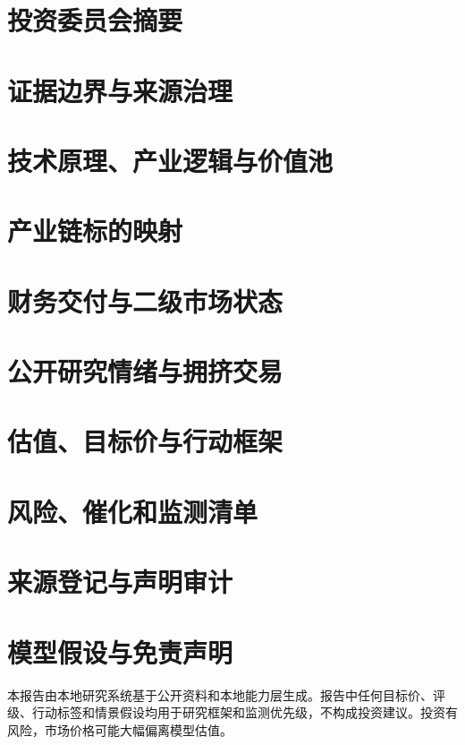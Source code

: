 \documentclass[a4paper,11pt,openany,fontset=none]{ctexrep}
\begin{document}
        \astockcover
        \tableofcontents
        \clearpage

        \chapter{投资委员会摘要}
        
        \chapter{证据边界与来源治理}
        
        \chapter{技术原理、产业逻辑与价值池}
        
        \chapter{产业链标的映射}
        
        \chapter{财务交付与二级市场状态}
        
        \chapter{公开研究情绪与拥挤交易}
        
        \chapter{估值、目标价与行动框架}
        
        \chapter{风险、催化和监测清单}
        

        \appendix
        \chapter{来源登记与声明审计}
        
        \chapter{模型假设与免责声明}
        

        \clearpage
        \begin{disclosurebox}[免责声明]
        \small
        本报告由本地研究系统基于公开资料和本地能力层生成。报告中任何目标价、评级、行动标签和情景假设均用于研究框架和监测优先级，不构成投资建议。投资有风险，市场价格可能大幅偏离模型估值。
        \end{disclosurebox}
        
\end{document}
